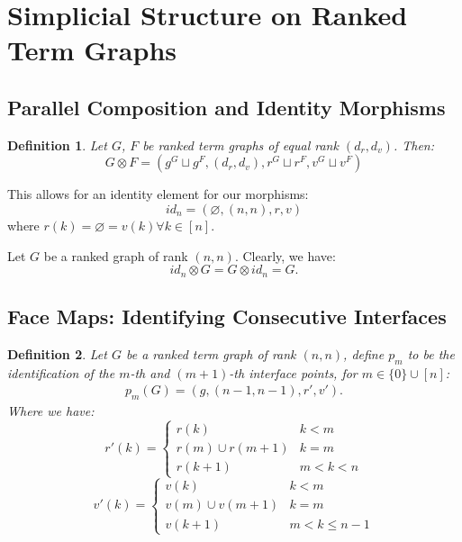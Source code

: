 \documentclass[12pt]{article}
\newtheorem{definition}{Definition}
\newcommand{\1}{\mathbbm{1}}
\begin{document}
\section{Simplicial Structure on Ranked Term Graphs}

\subsection{Parallel Composition and Identity Morphisms}
\begin{definition}
    Let $G$, $F$ be ranked term graphs of equal rank $(d_r, d_v)$. Then:
    $$G\otimes F = (g^G\sqcup g^F, (d_r, d_v), r^G \sqcup r^F, v^G \sqcup v^F)$$
\end{definition}

This allows for an identity element for our morphisms:
$$id_n = (\varnothing, (n, n), r, v)$$ 
where $r(k) = \varnothing = v(k) \forall k\in[n]$.

Let $G$ be a ranked graph of rank $(n,n)$. Clearly, we have:  
$$id_n \otimes G = G\otimes id_n = G.$$

\subsection{Face Maps: Identifying Consecutive Interfaces}
\begin{definition}
    Let $G$ be a ranked term graph of rank $(n,n)$, define $p_m$ to be the identification of the $m$-th and $(m+1)$-th interface points, for $m\in\{0\}\cup[n]$:
    \begin{align*}
        p_m(G) = (g, (n-1, n-1), r', v').
    \end{align*}
    Where we have:
    \[
    r'(k) = \begin{cases}
        r(k) & k < m\\
        r(m) \cup r(m+1) & k = m\\
        r(k + 1) & m < k < n
    \end{cases}
    \]
        \[
    v'(k) = \begin{cases}
        v(k) & k < m\\
        v(m) \cup v(m+1) & k = m\\
        v(k + 1) & m < k \leq n - 1
    \end{cases}
    \]
\end{definition}
\end{document}
